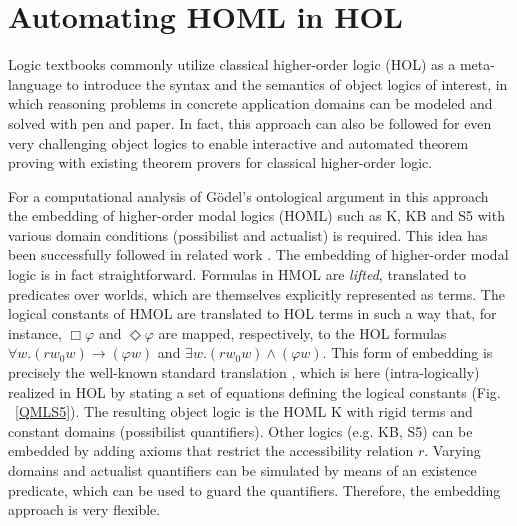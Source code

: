 \documentclass{article}
\newcommand{\imp}{\rightarrow}
\begin{document}








\section{Automating HOML in HOL}

Logic textbooks \cite{ToDo: which} commonly utilize classical higher-order logic (HOL)
\cite{Church} as a meta-language to introduce the syntax and the
semantics of object logics of interest, in which reasoning
problems in concrete application domains can be modeled and solved
with pen and paper. In fact, this approach can also be followed for even very challenging
object logics to
enable interactive and automated theorem proving with existing theorem provers for classical
higher-order logic.


For a computational analysis of G\"odel's ontological argument in this
approach the embedding of higher-order modal logics (HOML) such as K,
KB and S5 with various domain conditions (possibilist and actualist)
is required. This idea has been successfully followed in related work
\cite{C40}. The embedding of higher-order modal logic is in fact
straightforward. Formulas in HMOL are \emph{lifted}, translated to predicates
over worlds, which are themselves explicitly represented as
terms. The logical constants of HMOL are translated to HOL terms in such a way that, for instance, 
$\Box \varphi$ and $\Diamond \varphi$ are mapped, respectively, to the HOL formulas $\forall w. (r w_0 w) \imp (\varphi w)$ and $\exists w. (r w_0 w) \wedge (\varphi w)$. This form of embedding is precisely the well-known standard translation \cite{Ohlbach,ModalLogicPatrickBlackburn},
which is here (intra-logically) realized in HOL by stating a set of
equations defining the logical constants (Fig. ~\ref{QMLS5}). The resulting object logic is the HOML K with rigid terms and constant domains (possibilist quantifiers). Other logics (e.g. KB, S5) can be embedded by adding axioms that restrict the accessibility relation $r$. Varying domains and actualist quantifiers can be simulated by means of an existence predicate, which can be used to guard the quantifiers. Therefore, the embedding approach is very flexible.
\end{document}
